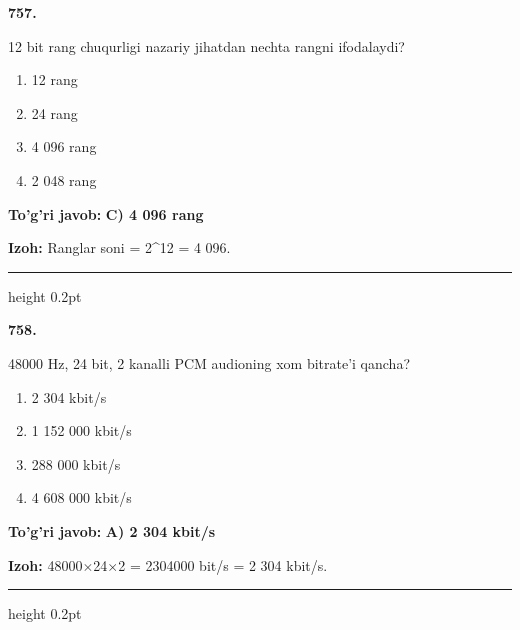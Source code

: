\documentclass[10pt,a4paper,oneside]{article}
\begin{document}
\noindent\textbf{\color{ink}757.}
\par
12 bit rang chuqurligi nazariy jihatdan nechta rangni ifodalaydi?
\begin{enumerate}[label=\Alph*),leftmargin=9mm]
\item 12 rang
\item 24 rang
\item 4 096 rang
\item 2 048 rang
\end{enumerate}
\begin{tcolorbox}[enhanced,breakable,colback=teal!4,colframe=teal!50!black,boxrule=0.5pt,arc=1.1mm,left=3mm,right=3mm,top=1.7mm,bottom=1.7mm,before skip=2mm,after skip=2mm]
\textbf{\color{teal}To'g'ri javob:} \textbf{C) 4 096 rang}
\par\smallskip
\textbf{Izoh:} Ranglar soni = 2\textasciicircum{}12 = 4 096.
\end{tcolorbox}
\vspace{2mm}\hrule height 0.2pt \vspace{3mm}

\noindent\textbf{\color{ink}758.}
\par
48000 Hz, 24 bit, 2 kanalli PCM audioning xom bitrate'i qancha?
\begin{enumerate}[label=\Alph*),leftmargin=9mm]
\item 2 304 kbit/s
\item 1 152 000 kbit/s
\item 288 000 kbit/s
\item 4 608 000 kbit/s
\end{enumerate}
\begin{tcolorbox}[enhanced,breakable,colback=teal!4,colframe=teal!50!black,boxrule=0.5pt,arc=1.1mm,left=3mm,right=3mm,top=1.7mm,bottom=1.7mm,before skip=2mm,after skip=2mm]
\textbf{\color{teal}To'g'ri javob:} \textbf{A) 2 304 kbit/s}
\par\smallskip
\textbf{Izoh:} 48000\ensuremath{\times}24\ensuremath{\times}2 = 2304000 bit/s = 2 304 kbit/s.
\end{tcolorbox}
\vspace{2mm}\hrule height 0.2pt \vspace{3mm}
\end{document}
